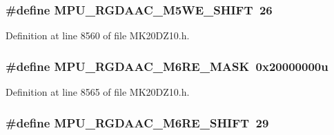 \subsubsection[{\texorpdfstring{M\+P\+U\+\_\+\+R\+G\+D\+A\+A\+C\+\_\+\+M5\+W\+E\+\_\+\+S\+H\+I\+FT}{MPU_RGDAAC_M5WE_SHIFT}}]{\setlength{\rightskip}{0pt plus 5cm}\#define M\+P\+U\+\_\+\+R\+G\+D\+A\+A\+C\+\_\+\+M5\+W\+E\+\_\+\+S\+H\+I\+FT~26}\hypertarget{group___m_p_u___register___masks_ga32b48238ec363343bb84eb701503ac64}{}\label{group___m_p_u___register___masks_ga32b48238ec363343bb84eb701503ac64}


Definition at line 8560 of file M\+K20\+D\+Z10.\+h.

\subsubsection[{\texorpdfstring{M\+P\+U\+\_\+\+R\+G\+D\+A\+A\+C\+\_\+\+M6\+R\+E\+\_\+\+M\+A\+SK}{MPU_RGDAAC_M6RE_MASK}}]{\setlength{\rightskip}{0pt plus 5cm}\#define M\+P\+U\+\_\+\+R\+G\+D\+A\+A\+C\+\_\+\+M6\+R\+E\+\_\+\+M\+A\+SK~0x20000000u}\hypertarget{group___m_p_u___register___masks_ga520ccd7afefe94f2c563302f3996dbe3}{}\label{group___m_p_u___register___masks_ga520ccd7afefe94f2c563302f3996dbe3}


Definition at line 8565 of file M\+K20\+D\+Z10.\+h.

\subsubsection[{\texorpdfstring{M\+P\+U\+\_\+\+R\+G\+D\+A\+A\+C\+\_\+\+M6\+R\+E\+\_\+\+S\+H\+I\+FT}{MPU_RGDAAC_M6RE_SHIFT}}]{\setlength{\rightskip}{0pt plus 5cm}\#define M\+P\+U\+\_\+\+R\+G\+D\+A\+A\+C\+\_\+\+M6\+R\+E\+\_\+\+S\+H\+I\+FT~29}\hypertarget{group___m_p_u___register___masks_ga0166b93dc6445dac1d73289ecdb8eda1}{}\label{group___m_p_u___register___masks_ga0166b93dc6445dac1d73289ecdb8eda1}


